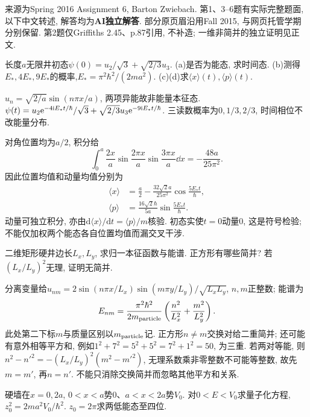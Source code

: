 来源为Spring 2016 Assignment 6, Barton Zwiebach. 第1、3--6题有实际完整题面, 以下中文转述, 解答均为\textbf{AI独立解答}. 部分原页眉沿用Fall 2015, 与网页托管学期分别保留. 第2题仅Griffiths 2.45、p.87引用, 不补造; 一维非简并的独立证明见正文.
\begin{exercise}
长度$a$无限井初态$\psi(0)=u_2/\sqrt3+\sqrt{2/3}u_3$. (a)是否为能态, 求时间态. (b)测得$E_*,4E_*,9E_*$的概率,$E_*=\pi^2\hbar^2/(2ma^2)$. (c)(d)求$\langle x\rangle(t),\langle p\rangle(t)$.
\end{exercise}
\begin{solution}
$u_n=\sqrt{2/a}\sin(n\pi x/a)$, 两项异能故非能量本征态. $\psi(t)=u_2\mathrm e^{-4\mathrm i E_*t/\hbar}/\sqrt3+\sqrt{2/3}u_3\mathrm e^{-9\mathrm i E_*t/\hbar}$. 三读数概率为$0,1/3,2/3$, 时间相位不改能量分布.

对角位置均为$a/2$, 积分给
\[
\int_0^a\frac{2x}{a}\sin\frac{2\pi x}{a}\sin\frac{3\pi x}{a}\dd x=-\frac{48a}{25\pi^2}.
\]
 因此位置均值和动量均值分别为
\begin{align*}
\langle x\rangle&=\frac a2-\frac{32\sqrt2a}{25\pi^2}\cos\frac{5E_*t}{\hbar},\\
\langle p\rangle&=\frac{16\sqrt2\hbar}{5a}\sin\frac{5E_*t}{\hbar}.
\end{align*}
动量可独立积分, 亦由$\mathrm d\langle x\rangle/\mathrm dt=\langle p\rangle/m$核验. 初态实使$t=0$动量0, 这是符号检验; 不能仅加权两个能态各自位置均值而漏交叉干涉.
\end{solution}
\begin{exercise}
二维矩形硬井边长$L_x,L_y$, 求归一本征函数与能谱. 正方形有哪些简并? 若$(L_x/L_y)^2$无理, 证明无简并.
\end{exercise}
\begin{solution}
分离变量给$u_{nm}=2\sin(n\pi x/L_x)\sin(m\pi y/L_y)/\sqrt{L_xL_y}$, $n,m$正整数; 能谱为
\[
E_{nm}=\frac{\pi^2\hbar^2}{2m_{\rm particle}}\left(\frac{n^2}{L_x^2}+\frac{m^2}{L_y^2}\right).
\]
 此处第二下标$m$与质量区别以$ m_{\rm particle}$记. 正方形$n\ne m$交换对给二重简并; 还可能有意外相等平方和, 例如$1^2+7^2=5^2+5^2=7^2+1^2=50$, 为三重. 若两对等能, 则$n^2-n'^2=-(L_x/L_y)^2(m^2-m'^2)$, 无理系数乘非零整数不可能等整数, 故先$m=m'$, 再$n=n'$. 不能只消除交换简并而忽略其他平方和关系.
\end{solution}
\begin{exercise}
硬墙在$x=0,2a$, $0<x<a$势0、$a<x<2a$势$V_0$. 对$0<E<V_0$求量子化方程, $z_0^2=2ma^2V_0/\hbar^2$. $z_0=2\pi$求两低能态至四位.
\end{exercise}
